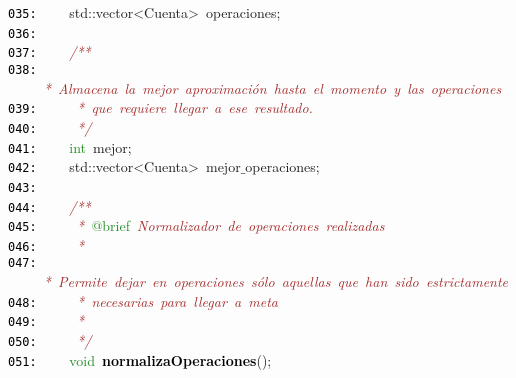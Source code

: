 \documentclass[a4paper,10pt]{scrartcl}
\begin{document}
{   \mbox{}\texttt{\textcolor{Black}{035:}} \ \ \ \ std\textcolor{BrickRed}{::}\textcolor{TealBlue}{vector\textless{}Cuenta\textgreater{}}\ operaciones\textcolor{BrickRed}{;} \\
   \mbox{}\texttt{\textcolor{Black}{036:}} \ \  \\
   \mbox{}\texttt{\textcolor{Black}{037:}} \ \ \ \ \textit{\textcolor{Brown}{/**}} \\
   \mbox{}\texttt{\textcolor{Black}{038:}} \textit{\textcolor{Brown}{\ \ \ \ \ *\ Almacena\ la\ mejor\ aproximación\ hasta\ el\ momento\ y\ las\ operaciones}} \\
   \mbox{}\texttt{\textcolor{Black}{039:}} \textit{\textcolor{Brown}{\ \ \ \ \ *\ que\ requiere\ llegar\ a\ ese\ resultado.}} \\
   \mbox{}\texttt{\textcolor{Black}{040:}} \textit{\textcolor{Brown}{\ \ \ \ \ */}} \\
   \mbox{}\texttt{\textcolor{Black}{041:}} \ \ \ \ \textcolor{ForestGreen}{int}\ mejor\textcolor{BrickRed}{;} \\
   \mbox{}\texttt{\textcolor{Black}{042:}} \ \ \ \ std\textcolor{BrickRed}{::}\textcolor{TealBlue}{vector\textless{}Cuenta\textgreater{}}\ mejor$\_$operaciones\textcolor{BrickRed}{;} \\
   \mbox{}\texttt{\textcolor{Black}{043:}} \ \  \\
   \mbox{}\texttt{\textcolor{Black}{044:}} \ \ \ \ \textit{\textcolor{Brown}{/**}} \\
   \mbox{}\texttt{\textcolor{Black}{045:}} \textit{\textcolor{Brown}{\ \ \ \ \ *\ }}\textcolor{ForestGreen}{@brief}\textit{\textcolor{Brown}{\ Normalizador\ de\ operaciones\ realizadas}} \\
   \mbox{}\texttt{\textcolor{Black}{046:}} \textit{\textcolor{Brown}{\ \ \ \ \ *\ }} \\
   \mbox{}\texttt{\textcolor{Black}{047:}} \textit{\textcolor{Brown}{\ \ \ \ \ *\ Permite\ dejar\ en\ operaciones\ sólo\ aquellas\ que\ han\ sido\ estrictamente}} \\
   \mbox{}\texttt{\textcolor{Black}{048:}} \textit{\textcolor{Brown}{\ \ \ \ \ *\ necesarias\ para\ llegar\ a\ meta}} \\
   \mbox{}\texttt{\textcolor{Black}{049:}} \textit{\textcolor{Brown}{\ \ \ \ \ *\ }} \\
   \mbox{}\texttt{\textcolor{Black}{050:}} \textit{\textcolor{Brown}{\ \ \ \ \ */}} \\
   \mbox{}\texttt{\textcolor{Black}{051:}} \ \ \ \ \textcolor{ForestGreen}{void}\ \textbf{\textcolor{Black}{normalizaOperaciones}}\textcolor{BrickRed}{();} \\
}
\end{document}
